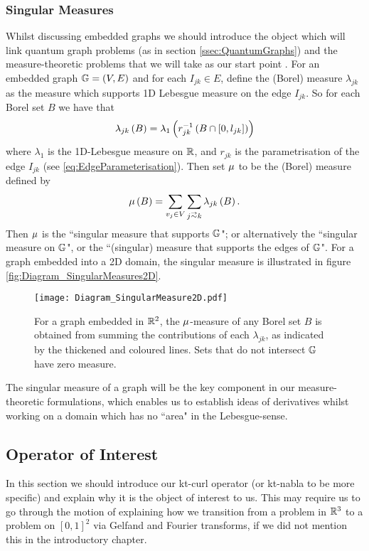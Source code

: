 \subsubsection{Singular Measures} \label{sssec:SingularMeasures}
Whilst discussing embedded graphs we should introduce the object which will link quantum graph problems (as in section \ref{ssec:QuantumGraphs}) and the measure-theoretic problems that we will take as our start point .
For an embedded graph $\mathbb{G} = \left( V,E \right)$ and for each $I_{jk}\in E$, define the (Borel) measure $\lambda_{jk}$ as the measure which supports 1D Lebesgue measure on the edge $I_{jk}$.
So for each Borel set $B$ we have that 
\begin{align*}
	\lambda_{jk}\left( B \right) = \lambda_{1}\left( r_{jk}^{-1}\left( B \cap \left[ 0,l_{jk} \right] \right) \right)
\end{align*}
where $\lambda_1$ is the 1D-Lebesgue measure on $\mathbb{R}$, and $r_{jk}$ is the parametrisation of the edge $I_{jk}$ (see \eqref{eq:EdgeParameterisation}).
Then set $\mu$ to be the (Borel) measure defined by
\begin{align*}
	\ddmes\bracs{B} = \sum_{v_j\in V}\sum_{j\conLeft k} \lambda_{jk}\bracs{B}.
\end{align*}
Then $\mu$ is the ``singular measure that supports $\mathbb{G}$"; or alternatively the ``singular measure on $\mathbb{G}$", or the ``(singular) measure that supports the edges of $\mathbb{G}$".
For a graph embedded into a 2D domain, the singular measure is illustrated in figure \ref{fig:Diagram_SingularMeasures2D}.
\begin{figure}[t!]
	\centering
	\texttt{[image: Diagram\_SingularMeasure2D.pdf]}
	\caption{\label{fig:Diagram_SingularMeasure2D} For a graph embedded in $\mathbb{R}^2$, the $\mu$-measure of any Borel set $B$ is obtained from summing the contributions of each $\lambda_{jk}$, as indicated by the thickened and coloured lines.
	Sets that do not intersect $\mathbb{G}$ have zero measure.}
\end{figure} \newline

The singular measure of a graph will be the key component in our measure-theoretic formulations, which enables us to establish ideas of derivatives whilst working on a domain which has no ``area" in the Lebesgue-sense.

\subsection{Operator of Interest} \label{ssec:ktCurls}
In this section we should introduce our kt-curl operator (or kt-nabla to be more specific) and explain why it is the object of interest to us.
This may require us to go through the motion of explaining how we transition from a problem in $\mathbb{R}^3$ to a problem on $[0,1]^2$ via Gelfand and Fourier transforms, if we did not mention this in the introductory chapter.

